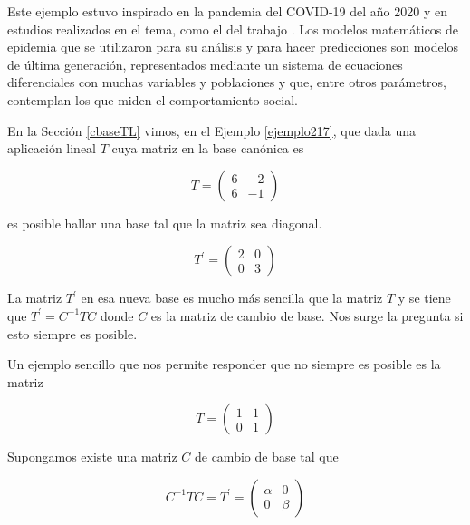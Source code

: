 \bigskip


\begin{remark}
Este ejemplo estuvo inspirado en la pandemia del COVID-19 del año 2020 y en estudios realizados en el tema, como el del trabajo \cite{covid}.  Los modelos matemáticos de epidemia que se utilizaron para su análisis  y para hacer predicciones  son modelos  de última generación,  representados mediante un sistema de ecuaciones diferenciales  con muchas variables y  poblaciones y que, entre otros  parámetros,  contemplan los que miden el comportamiento social. 
\end{remark}



En  la Sección \ref{cbaseTL} vimos, en el  Ejemplo \ref{ejemplo217}, que dada una aplicación lineal $T$ cuya matriz en la base canónica es 

$$T=\left(\begin{array}{cc}  6 & -2  \\ 6 &  -1
\end{array}
 \right)$$

\bigskip

\noindent
es posible hallar  una base tal que la matriz sea diagonal. 


$$T^\prime=\left(\begin{array}{cc}  2 & 0  \\ 0 &  3
\end{array}
\right)$$

\bigskip


La matriz $T^\prime$ en esa nueva base es mucho más sencilla que la matriz $T$ y se tiene que $T^\prime=C^{-1}TC$  donde $C$ es la matriz de cambio de base.
Nos surge  la pregunta si esto siempre es posible.


\bigskip


Un ejemplo sencillo que nos permite responder que no siempre es posible es la matriz 

$$T=\left(\begin{array}{cc}  1 & 1  \\ 0 &  1
\end{array}
 \right)$$

\bigskip


Supongamos existe una matriz $C$ de cambio de base  tal que 

\bigskip

$$C^{-1}TC=T^\prime=\left(\begin{array}{cc}  \alpha & 0  \\ 0 &  \beta
\end{array}
 \right)$$
 
